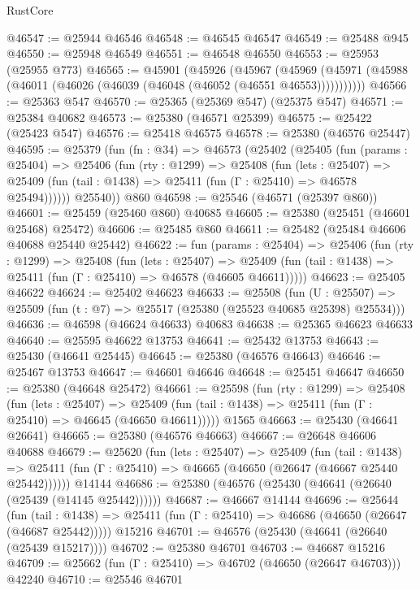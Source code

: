 \begin{lexlean}{RustCore}
\begin{coremodule}
@46547 := @25944 @46546
@46548 := @46545 @46547
@46549 := @25488 @945
@46550 := @25948 @46549
@46551 := @46548 @46550
@46553 := @25953 (@25955 @773)
@46565 := @45901
    (@45926
      (@45967
        (@45969 (@45971 (@45988 (@46011 (@46026 (@46039 (@46048 (@46052 (@46551 @46553)))))))))))
@46566 := @25363 @547
@46570 := @25365 (@25369 @547) (@25375 @547)
@46571 := @25384 @40682
@46573 := @25380 (@46571 @25399)
@46575 := @25422 (@25423 @547)
@46576 := @25418 @46575
@46578 := @25380 (@46576 @25447)
@46595 := @25379
    (fun (fn : @34) =>
    @46573
      (@25402
        (@25405
          (fun (params : @25404) =>
          @25406
            (fun (rty : @1299) =>
            @25408
              (fun (lets : @25407) =>
              @25409 (fun (tail : @1438) => @25411 (fun (Γ : @25410) => @46578 @25494))))))
        @25540))
    @860
@46598 := @25546 (@46571 (@25397 @860))
@46601 := @25459 (@25460 @860) @40685
@46605 := @25380 (@25451 (@46601 @25468) @25472)
@46606 := @25485 @860
@46611 := @25482 (@25484 @46606 @40688 @25440 @25442)
@46622 := fun (params : @25404) =>
  @25406
    (fun (rty : @1299) =>
    @25408
      (fun (lets : @25407) =>
      @25409 (fun (tail : @1438) => @25411 (fun (Γ : @25410) => @46578 (@46605 @46611)))))
@46623 := @25405 @46622
@46624 := @25402 @46623
@46633 := @25508
    (fun (U : @25507) => @25509 (fun (t : @7) => @25517 (@25380 (@25523 @40685 @25398) @25534)))
@46636 := @46598 (@46624 @46633) @40683
@46638 := @25365 @46623 @46633
@46640 := @25595 @46622 @13753
@46641 := @25432 @13753
@46643 := @25430 (@46641 @25445)
@46645 := @25380 (@46576 @46643)
@46646 := @25467 @13753
@46647 := @46601 @46646
@46648 := @25451 @46647
@46650 := @25380 (@46648 @25472)
@46661 := @25598
    (fun (rty : @1299) =>
    @25408
      (fun (lets : @25407) =>
      @25409 (fun (tail : @1438) => @25411 (fun (Γ : @25410) => @46645 (@46650 @46611)))))
    @1565
@46663 := @25430 (@46641 @26641)
@46665 := @25380 (@46576 @46663)
@46667 := @26648 @46606 @40688
@46679 := @25620
    (fun (lets : @25407) =>
    @25409
      (fun (tail : @1438) =>
      @25411 (fun (Γ : @25410) => @46665 (@46650 (@26647 (@46667 @25440 @25442))))))
    @14144
@46686 := @25380 (@46576 (@25430 (@46641 (@26640 (@25439 (@14145 @25442))))))
@46687 := @46667 @14144
@46696 := @25644
    (fun (tail : @1438) => @25411 (fun (Γ : @25410) => @46686 (@46650 (@26647 (@46687 @25442)))))
    @15216
@46701 := @46576 (@25430 (@46641 (@26640 (@25439 @15217))))
@46702 := @25380 @46701
@46703 := @46687 @15216
@46709 := @25662 (fun (Γ : @25410) => @46702 (@46650 (@26647 @46703))) @42240
@46710 := @25546 @46701

\end{coremodule}
\end{lexlean}
